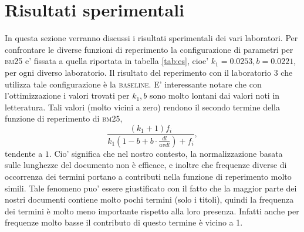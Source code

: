 \section{Risultati sperimentali}
\label{sec:risult-sper}

In questa sezione verranno discussi i risultati sperimentali dei vari laboratori. Per confrontare le diverse funzioni di reperimento la configurazione di parametri per \textsc{bm25} e' fissata a quella riportata in tabella \ref{tab:es}, cioe' $k_1 = 0.0253, b = 0.0221$, per ogni diverso laboratorio. Il risultato del reperimento con il laboratorio 3 che utilizza tale configurazione \`e la \textsc{baseline}.
E' interessante notare che con l'ottimizzazione i valori trovati per $k_1, b$ sono molto lontani dai valori noti in letteratura. Tali valori (molto vicini a zero) rendono il secondo termine della funzione di reperimento di \textsc{bm25}, 
\[\frac{(k_1 + 1)f_i}{k_1(1-b+b \cdot \frac{dl}{avdl})+f_i},\] 
tendente a $1$. Cio' significa che nel nostro contesto, la normalizzazione basata sulle lunghezze del documento non \`e efficace, e inoltre che frequenze diverse di occorrenza dei termini portano a contributi nella funzione di reperimento molto simili. Tale fenomeno puo' essere giustificato con il fatto che la maggior parte dei nostri documenti contiene molto pochi termini (solo i titoli), quindi la frequenza dei termini \`e molto meno importante rispetto alla loro presenza. Infatti anche per frequenze molto basse il contributo di questo termine \`e vicino a 1.

